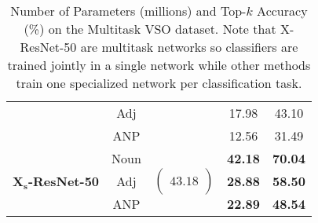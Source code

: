 \documentclass{sig-alternate-05-2015}
\newcommand{\mb}{\mathbf}
\begin{document}
\begin{table}[t]
\begin{tabular}{lcccc}
    & Adj & & 17.98 & 43.10 \\
    & ANP & & 12.56 & 31.49 \\ \hline
    \multirow{3}{*}{\textbf{X$_{\mb s}$-ResNet-50}} & Noun & \multirow{3}{*}{$\begin{pmatrix} \, \\ 43.18 \\ \, \end{pmatrix}$} & \textbf{42.18} & \textbf{70.04} \\
    & Adj & & \textbf{28.88} & \textbf{58.50} \\
    & ANP & & \textbf{22.89} & \textbf{48.54} \\ \hline
  \end{tabular}
  \caption{Number of Parameters (millions) and Top-$k$ Accuracy (\%) on the Multitask VSO dataset. Note that X-ResNet-50 are multitask networks so classifiers are trained jointly in a single network while other methods train one specialized network per classification task.}
  \label{tab:mtvso_classifiers}
\end{table}
\end{document}
